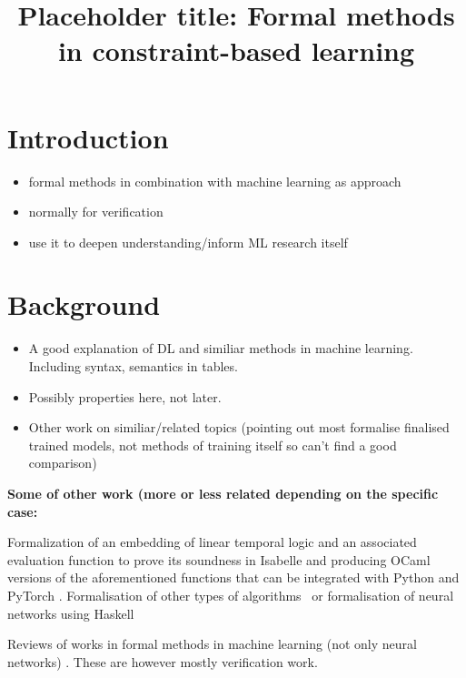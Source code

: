 \documentclass[]{article}
\title{Placeholder title: Formal methods in constraint-based learning}
\author{}
\begin{document}
\maketitle

\begin{abstract}

\end{abstract}

\section{Introduction}

\begin{itemize}
	\item formal methods in combination with machine learning as approach
	\item normally for verification
	\item use it to deepen understanding/inform ML research itself
\end{itemize}

\section{Background}
\begin{itemize}
	\item A good explanation of DL and similiar methods in machine learning. Including syntax, semantics in tables.
	\item Possibly properties here, not later.
	\item Other work on similiar/related topics (pointing out most formalise finalised trained models, not methods of training itself so can't find a good comparison)
\end{itemize}

\textbf{Some of other work (more or less related depending on the specific case:}

 Formalization of an embedding of linear temporal logic and an associated evaluation function to prove its soundness in Isabelle and producing OCaml versions of the aforementioned functions that can be integrated with Python and PyTorch \cite{chevallier2022constrained}.  Formalisation of other types of algorithms~\cite{daukantas2021trimming} or formalisation of neural networks using Haskell~\cite{xie2023haskell}
 
 Reviews of works in formal methods in machine learning (not only neural networks) \cite{urban2021review,9842406}. These are however mostly verification work.
 
\end{document}
